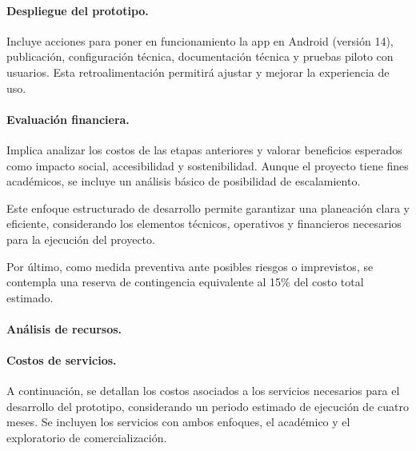 \paragraph{\textbf{Despliegue del prototipo.}} 
Incluye acciones para poner en funcionamiento la app en Android (versión 14), publicación, configuración técnica, documentación técnica y pruebas piloto con usuarios. Esta retroalimentación permitirá ajustar y mejorar la experiencia de uso.

\paragraph{\textbf{Evaluación financiera.}} 
Implica analizar los costos de las etapas anteriores y valorar beneficios esperados como impacto social, accesibilidad y sostenibilidad. Aunque el proyecto tiene fines académicos, se incluye un análisis básico de posibilidad de escalamiento.

Este enfoque estructurado de desarrollo permite garantizar una planeación clara y eficiente, considerando los elementos técnicos, operativos y financieros necesarios para la ejecución del proyecto.

Por último, como medida preventiva ante posibles riesgos o imprevistos, se contempla una reserva de contingencia equivalente al 15\% del costo total estimado.


\paragraph{\textbf{Análisis de recursos.}} 
\paragraph{\textbf{Costos de servicios.}} 
A continuación, se detallan los costos asociados a los servicios necesarios para el desarrollo del prototipo, considerando un periodo estimado de ejecución de cuatro meses. Se incluyen los servicios con ambos enfoques, el académico y el exploratorio de comercialización.


